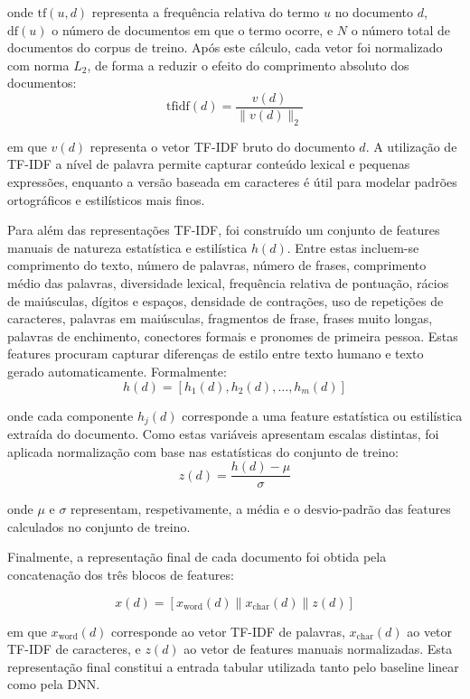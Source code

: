\documentclass[a4paper,12pt]{scrreprt}
\begin{document}
        onde $\text{tf}(u,d)$ representa a frequência relativa do termo $u$ no documento $d$, $\text{df}(u)$ o número de documentos em que o termo ocorre, e $N$ o número total de documentos do corpus de treino. Após este cálculo, cada vetor foi normalizado com norma $L_2$, de forma a reduzir o efeito do comprimento absoluto dos documentos:
        \[
        \text{tfidf}(d) = \frac{v(d)}{\|v(d)\|_2}
        \]

        em que $v(d)$ representa o vetor TF-IDF bruto do documento $d$. A utilização de TF-IDF a nível de palavra permite capturar conteúdo lexical e pequenas expressões, enquanto a versão baseada em caracteres é útil para modelar padrões ortográficos e estilísticos mais finos.

        Para além das representações TF-IDF, foi construído um conjunto de features manuais de natureza estatística e estilística $h(d)$. Entre estas incluem-se comprimento do texto, número de palavras, número de frases, comprimento médio das palavras, diversidade lexical, frequência relativa de pontuação, rácios de maiúsculas, dígitos e espaços, densidade de contrações, uso de repetições de caracteres, palavras em maiúsculas, fragmentos de frase, frases muito longas, palavras de enchimento, conectores formais e pronomes de primeira pessoa. Estas features procuram capturar diferenças de estilo entre texto humano e texto gerado automaticamente. Formalmente:
        \[h(d)=[h_1 (d),h_2 (d),…,h_m (d)]\]

        onde cada componente $h_j(d)$ corresponde a uma feature estatística ou estilística extraída do documento. Como estas variáveis apresentam escalas distintas, foi aplicada normalização com base nas estatísticas do conjunto de treino:
        \[z(d)=\frac{h(d)-\mu}{\sigma}\]

        onde $\mu$ e $\sigma$ representam, respetivamente, a média e o desvio-padrão das features calculados no conjunto de treino.

        Finalmente, a representação final de cada documento foi obtida pela concatenação dos três blocos de features:

        \[x(d)=[x_{\text{word}}(d) \| x_{\text{char}}(d) \| z(d)]\]

        em que $x_{\text{word}}(d)$ corresponde ao vetor TF-IDF de palavras, $x_{\text{char}}(d)$ ao vetor TF-IDF de caracteres, e $z(d)$ ao vetor de features manuais normalizadas. Esta representação final constitui a entrada tabular utilizada tanto pelo baseline linear como pela DNN.
\end{document}
